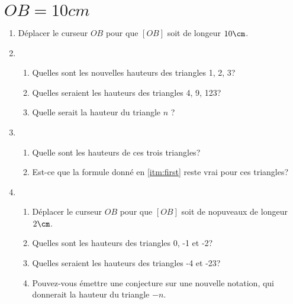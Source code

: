 \section{$OB = 10cm$}

\begin{enumerate}\setlength{\itemsep}{15pt}%
    \item Déplacer le curseur $OB$ pour que $[OB]$ soit de longeur $10\cm$.
    \item \begin{enumerate} \item Quelles sont les nouvelles hauteurs des triangles 1, 2, 3?
            \item Quelles seraient les hauteurs des triangles 4, 9, 123?
            \item \label{itm:first} Quelle serait la hauteur du triangle $n$ ?
    \end{enumerate}
    \item \begin{enumerate} 
        \item Quelle sont les hauteurs de ces trois triangles?
        \item Est-ce que la formule donné en \ref{itm:first} reste vrai pour ces triangles?
    \end{enumerate}
    \item \begin{enumerate}
        \item Déplacer le curseur $OB$ pour que $[OB]$ soit de nopuveaux de longeur $2\cm$.
        \item Quelles sont les hauteurs des triangles 0, -1 et -2?
        \item Quelles seraient les hauteurs des triangles -4 et -23?
        \item Pouvez-vous émettre une conjecture sur une nouvelle notation,
        qui donnerait la hauteur du triangle $-n$.
    \end{enumerate}
\end{enumerate}